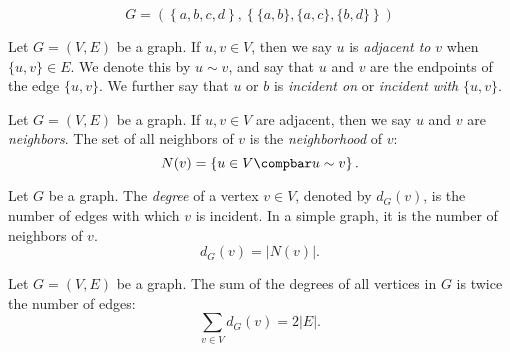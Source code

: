 \documentclass[12pt]{article}
\begin{document}
\begin{exmp}
    \[G = \left(\left\{a, b, c, d\right\}, \left\{\{a, b\}, \{a, c\}, \{b, d\}\right\}\right)\]

    \begin{center}
    \end{center}
\end{exmp}

\begin{defn}
    Let $G = (V, E)$ be a graph. If $u, v \in V$, then we say $u$ is \emph{adjacent to} $v$ when $\{u, v\} \in E$. We denote this by $u \sim v$, and say that $u$ and $v$ are the endpoints of the edge $\{u, v\}$. We further say that $u$ or $b$ is \emph{incident on} or \emph{incident with} $\{u, v\}$.
\end{defn}

\begin{defn}
    Let $G = (V, E)$ be a graph. If $u, v \in V$ are adjacent, then we say $u$ and $v$ are \emph{neighbors}. The set of all neighbors of $v$ is the \emph{neighborhood} of $v$:
    \[N(v) = \left\{u \in V \compbar u \sim v \right\}.\]
\end{defn}

\begin{defn}
    Let $G$ be a graph. The \emph{degree} of a vertex $v \in V$, denoted by $d_G(v)$, is the number of edges with which $v$ is incident. In a simple graph, it is the number of neighbors of $v$. \[d_G(v) = |N(v)|.\]
\end{defn}

\begin{thm}\label{sum-degrees-is-twice-edges}
    Let $G = (V, E)$ be a graph. The sum of the degrees of all vertices in $G$ is twice the number of edges:
    \[\sum_{v\in V}d_G(v) = 2|E|.\]
\end{thm}
\end{document}
